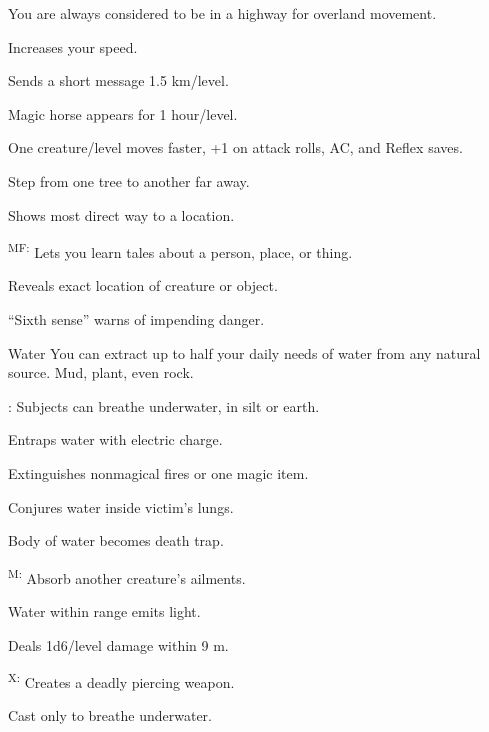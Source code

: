 {}
{You are always considered to be in a highway for overland movement.}
{
	\item {} Increases your speed.
	\item {} Sends a short message 1.5 km/level.
	\item {} Magic horse appears for 1 hour/level.
	\item {} One creature/level moves faster, +1 on attack rolls, AC, and Reflex saves.
	\item {} Step from one tree to another far away.
	\item {} Shows most direct way to a location.
	\item {}\textsuperscript{MF:} Lets you learn tales about a person, place, or thing.
	\item {} Reveals exact location of creature or object.
	\item {} ``Sixth sense'' warns of impending danger.
}

{Water}
{You can extract up to half your daily needs of water from any natural source. Mud, plant, even rock.}
{
	\item {}\footnotemark[1]: Subjects can breathe underwater, in silt or earth.
	\item {} Entraps water with electric charge.
	\item {} Extinguishes nonmagical fires or one magic item.
	\item {} Conjures water inside victim's lungs.
	\item {} Body of water becomes death trap.
	\item {}\textsuperscript{M:} Absorb another creature's ailments.
	\item {} Water within range emits light.
	\item {} Deals 1d6/level damage within 9 m.
	\item {}\textsuperscript{X:} Creates a deadly piercing weapon.
}
 Cast only to breathe underwater.

